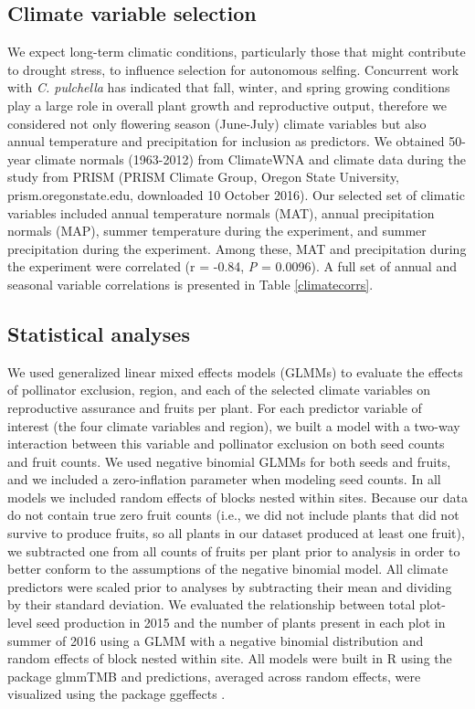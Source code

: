 \documentclass{article}
\begin{document}
\subsection*{Climate variable selection}

We expect long-term climatic conditions, particularly those that might contribute to drought stress, to influence selection for autonomous selfing. Concurrent work with \textit{C. pulchella} \citep{bontrager2018gene} has indicated that fall, winter, and spring growing conditions play a large role in overall plant growth and reproductive output, therefore we considered not only flowering season (June-July) climate variables but also annual temperature and precipitation for inclusion as predictors. We obtained 50-year climate normals (1963-2012) from ClimateWNA \citep{wang2012climatewna} and climate data during the study from PRISM (PRISM Climate Group, Oregon State University, prism.oregonstate.edu, downloaded 10 October 2016). Our selected set of climatic variables included annual temperature normals (MAT), annual precipitation normals (MAP), summer temperature during the experiment, and summer precipitation during the experiment. Among these, MAT and precipitation during the experiment were correlated (r = -0.84, \textit{P} = 0.0096). A full set of annual and seasonal variable correlations is presented in Table \ref{climatecorrs}.

\subsection*{Statistical analyses}

We used generalized linear mixed effects models (GLMMs) to evaluate the effects of pollinator exclusion, region, and each of the selected climate variables on reproductive assurance and fruits per plant. For each predictor variable of interest (the four climate variables and region), we built a model with a two-way interaction between this variable and pollinator exclusion on both seed counts and fruit counts. We used negative binomial GLMMs for both seeds and fruits, and we included a zero-inflation parameter when modeling seed counts. In all models we included random effects of blocks nested within sites. Because our data do not contain true zero fruit counts (i.e., we did not include plants that did not survive to produce fruits, so all plants in our dataset produced at least one fruit), we subtracted one from all counts of fruits per plant prior to analysis in order to better conform to the assumptions of the negative binomial model. All climate predictors were scaled prior to analyses by subtracting their mean and dividing by their standard deviation. We evaluated the relationship between total plot-level seed production in 2015 and the number of plants present in each plot in summer of 2016 using a GLMM with a negative binomial distribution and random effects of block nested within site. All models were built in R \citep{Rcore} using the package glmmTMB \citep{brooks2017glmmtmb} and predictions, averaged across random effects, were visualized using the package ggeffects \citep{ggeffects}.
\end{document}
